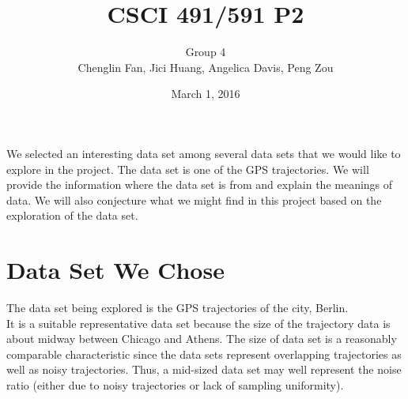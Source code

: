 \documentclass[11pt]{article}
\title{CSCI 491/591 P2}
\date{March 1, 2016}
\author{Group 4\\Chenglin Fan, Jici Huang,
Angelica Davis, Peng Zou}
\begin{document}
\maketitle
\noindent
We selected an interesting data set among several data sets
that we would like to explore in the project. The data set is one of the GPS trajectories. We will provide the information where the data set is from and explain the meanings of data. We will also conjecture what we might find in this project based on the exploration of the data set.
\section*{Data Set We Chose}
The data set being explored is the GPS trajectories of the city, Berlin. \\
It is a suitable representative data set because the size of the trajectory data is about midway between Chicago and Athens. The size of data set is a reasonably comparable characteristic since the data sets represent overlapping trajectories as well as noisy trajectories. Thus, a mid-sized data set may well represent the noise ratio (either due to noisy trajectories or lack of sampling uniformity).
\end{document}
